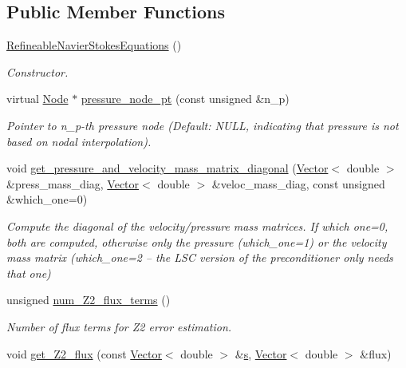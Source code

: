 \subsection*{Public Member Functions}
\begin{DoxyCompactItemize}
\item 
\hyperlink{classoomph_1_1RefineableNavierStokesEquations_a533bcd11b492c5dbf308079722f7f95d}{Refineable\+Navier\+Stokes\+Equations} ()
\begin{DoxyCompactList}\small\item\em Constructor. \end{DoxyCompactList}\item 
virtual \hyperlink{classoomph_1_1Node}{Node} $\ast$ \hyperlink{classoomph_1_1RefineableNavierStokesEquations_acf35b4945a4b528f1b4eddfd6ca0c3d7}{pressure\+\_\+node\+\_\+pt} (const unsigned \&n\+\_\+p)
\begin{DoxyCompactList}\small\item\em Pointer to n\+\_\+p-\/th pressure node (Default\+: N\+U\+LL, indicating that pressure is not based on nodal interpolation). \end{DoxyCompactList}\item 
void \hyperlink{classoomph_1_1RefineableNavierStokesEquations_a94c16c8b4aa810e9e2f8df263654eaed}{get\+\_\+pressure\+\_\+and\+\_\+velocity\+\_\+mass\+\_\+matrix\+\_\+diagonal} (\hyperlink{classoomph_1_1Vector}{Vector}$<$ double $>$ \&press\+\_\+mass\+\_\+diag, \hyperlink{classoomph_1_1Vector}{Vector}$<$ double $>$ \&veloc\+\_\+mass\+\_\+diag, const unsigned \&which\+\_\+one=0)
\begin{DoxyCompactList}\small\item\em Compute the diagonal of the velocity/pressure mass matrices. If which one=0, both are computed, otherwise only the pressure (which\+\_\+one=1) or the velocity mass matrix (which\+\_\+one=2 -- the L\+SC version of the preconditioner only needs that one) \end{DoxyCompactList}\item 
unsigned \hyperlink{classoomph_1_1RefineableNavierStokesEquations_a7eb93c82d587b3b3c3782e3dc0d0874f}{num\+\_\+\+Z2\+\_\+flux\+\_\+terms} ()
\begin{DoxyCompactList}\small\item\em Number of \textquotesingle{}flux\textquotesingle{} terms for Z2 error estimation. \end{DoxyCompactList}\item 
void \hyperlink{classoomph_1_1RefineableNavierStokesEquations_af26506994293f9d72d0382c1efe67749}{get\+\_\+\+Z2\+\_\+flux} (const \hyperlink{classoomph_1_1Vector}{Vector}$<$ double $>$ \&\hyperlink{cfortran_8h_ab7123126e4885ef647dd9c6e3807a21c}{s}, \hyperlink{classoomph_1_1Vector}{Vector}$<$ double $>$ \&flux)

\end{DoxyCompactItemize}
